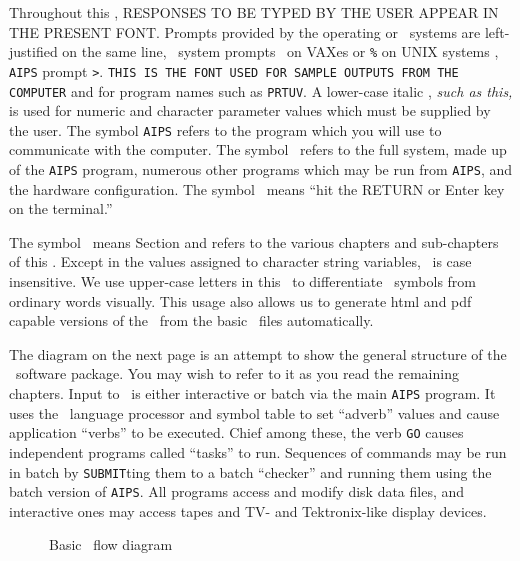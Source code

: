 
    Throughout this \COOKBOOK, {\us RESPONSES TO BE TYPED BY THE USER
APPEAR IN THE PRESENT FONT}\@.  Prompts provided by the operating or
\AIPS\ systems are left-justified on the same line, \eg\ system
prompts \dol\ on VAXes or {{\tt \%}} on UNIX systems , {\tt AIPS} prompt
\hbox{{\tt >}}.  {\tt THIS IS THE FONT USED FOR SAMPLE OUTPUTS FROM
THE COMPUTER} and for program names such as {\tt PRTUV}\@.  A
lower-case italic , {\it such as this,\/} is used for
numeric and character parameter values which must be supplied by the
user.  The symbol {\tt AIPS} refers to the program which you will use
to communicate with the computer.  The symbol \AIPS\ refers to the full
system, made up of the {\tt AIPS} program, numerous other programs
which may be run from {\tt AIPS}, and the hardware configuration.  The
symbol \CR\ means ``hit the {\us RETURN} or {\us Enter} key on the
terminal.''

The symbol \Schar\ means Section and refers to the various chapters and
sub-chapters of this \COOKBOOK\@.  Except in the values assigned to
character string variables, \AIPS\ is case insensitive.  We use
upper-case letters in this \COOKBOOK\ to differentiate \AIPS\ symbols
from ordinary words visually.  This usage also allows us to generate
html and pdf capable versions of the \COOKBOOK\ from the basic \TEX\
files automatically.


The diagram on the next page is an attempt to show the general
structure of the \AIPS\ software package.  You may wish to refer to it
as you read the remaining chapters.  Input to \AIPS\ is either
interactive or batch via the main {\tt AIPS} program.  It uses the
\POPS\ language processor and symbol table to set ``adverb''
values and cause application ``verbs'' to be executed.  Chief among
these, the verb {\tt GO} causes independent programs called ``tasks''
to run.  Sequences of commands may be run in batch by {\tt SUBMIT}ting
them to a batch ``checker'' and running them using the batch version
of {\tt AIPS}\@.  All programs access and modify disk data files, and
interactive ones may access tapes and TV- and Tektronix-like display
devices.\iodx{structure of \AIPS}

\vfill\eject
\begin{figure}
\caption{Basic \AIPS\ flow diagram}
\label{fig:aipsflow}
\end{figure}
